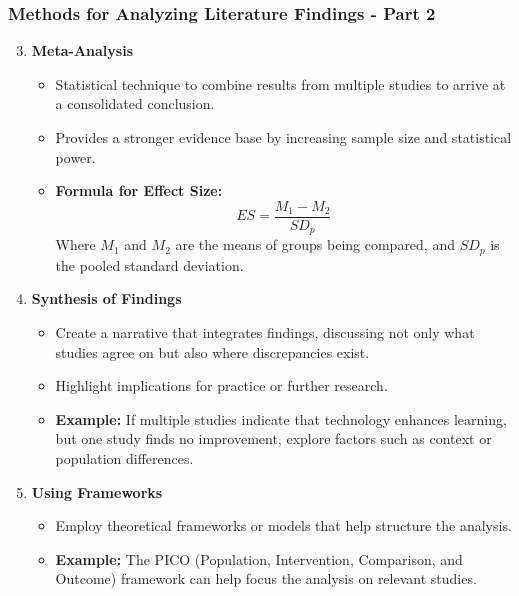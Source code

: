 \documentclass[aspectratio=169]{beamer}
\begin{document}
\begin{frame}[fragile]
    \frametitle{Methods for Analyzing Literature Findings - Part 2}
    \begin{enumerate}
        \setcounter{enumi}{2} %
        \item \textbf{Meta-Analysis}
            \begin{itemize}
                \item Statistical technique to combine results from multiple studies to arrive at a consolidated conclusion.
                \item Provides a stronger evidence base by increasing sample size and statistical power.
                \item \textbf{Formula for Effect Size:}
                \begin{equation}
                ES = \frac{M_1 - M_2}{SD_p}
                \end{equation}
                Where \( M_1 \) and \( M_2 \) are the means of groups being compared, and \( SD_p \) is the pooled standard deviation.
            \end{itemize}

        \item \textbf{Synthesis of Findings}
            \begin{itemize}
                \item Create a narrative that integrates findings, discussing not only what studies agree on but also where discrepancies exist.
                \item Highlight implications for practice or further research.
                \item \textbf{Example:} If multiple studies indicate that technology enhances learning, but one study finds no improvement, explore factors such as context or population differences.
            \end{itemize}

        \item \textbf{Using Frameworks}
            \begin{itemize}
                \item Employ theoretical frameworks or models that help structure the analysis.
                \item \textbf{Example:} The PICO (Population, Intervention, Comparison, and Outcome) framework can help focus the analysis on relevant studies.
            \end{itemize}
    \end{enumerate}
\end{frame}
\end{document}

